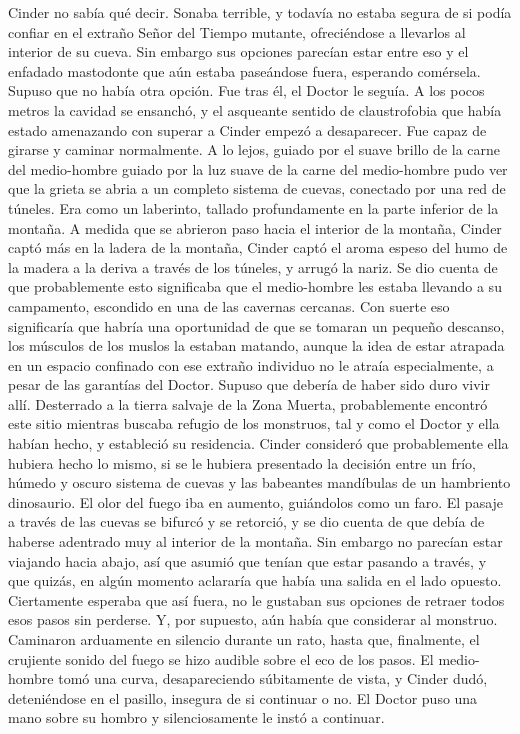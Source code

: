 Cinder no sabía qué decir. Sonaba terrible, y todavía no estaba segura de si podía confiar en el extraño Señor del Tiempo mutante, ofreciéndose a llevarlos al interior de su cueva. Sin embargo sus opciones parecían estar entre eso y el enfadado mastodonte que aún estaba paseándose fuera, esperando comérsela. Supuso que no había otra opción. Fue tras él, el Doctor le seguía.
A los pocos metros la cavidad se ensanchó, y el asqueante sentido de claustrofobia que había estado amenazando con superar a Cinder empezó a desaparecer. Fue capaz de girarse y caminar normalmente. A lo lejos, guiado por el suave brillo de la carne del medio-hombre guiado por la luz suave de la carne del medio-hombre pudo ver que la grieta se abria a un completo sistema de cuevas, conectado por una red de túneles. Era como un laberinto, tallado profundamente en la parte inferior de la montaña.
A medida que se abrieron paso hacia el interior de la montaña, Cinder captó más en la ladera de la montaña, Cinder captó el aroma espeso del humo de la madera a la deriva a través de los túneles, y arrugó la nariz. Se dio cuenta de que probablemente esto significaba que el medio-hombre les estaba llevando a su campamento, escondido en una de las cavernas cercanas. Con suerte eso significaría que habría una oportunidad de que se tomaran un pequeño descanso, los músculos de los muslos la estaban matando, aunque la idea de estar atrapada en un espacio confinado con ese extraño individuo no le atraía especialmente, a pesar de las garantías del Doctor.
Supuso que debería de haber sido duro vivir allí. Desterrado a la tierra salvaje de la Zona Muerta, probablemente encontró este sitio mientras buscaba refugio de los monstruos, tal y como el Doctor y ella habían hecho, y estableció su residencia. Cinder consideró que probablemente ella hubiera hecho lo mismo, si se le hubiera presentado la decisión entre un frío, húmedo y oscuro sistema de cuevas y las babeantes mandíbulas de un hambriento dinosaurio.
El olor del fuego iba en aumento, guiándolos como un faro. El pasaje a través de las cuevas se bifurcó y se retorció, y se dio cuenta de que debía de haberse adentrado muy al interior de la montaña. Sin embargo no parecían estar viajando hacia abajo, así que asumió que tenían que estar pasando a través, y que quizás, en algún momento aclararía que había una salida en el lado opuesto. Ciertamente esperaba que así fuera, no le gustaban sus opciones de retraer todos esos pasos sin perderse. Y, por supuesto, aún había que considerar al monstruo.
Caminaron arduamente en silencio durante un rato, hasta que, finalmente, el crujiente sonido del fuego se hizo audible sobre el eco de los pasos. El medio-hombre tomó una curva, desapareciendo súbitamente de vista, y Cinder dudó, deteniéndose en el pasillo, insegura de si continuar o no. El Doctor puso una mano sobre su hombro y silenciosamente le instó a continuar.
